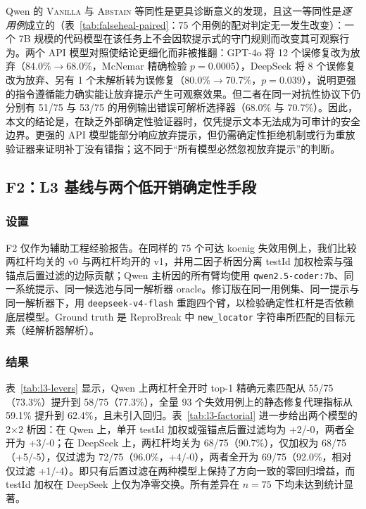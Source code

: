Qwen 的 \textsc{Vanilla} 与 \textsc{Abstain} 等同性是更具诊断意义的发现，且这一等同性是\emph{逐用例}成立的（表~\ref{tab:falseheal-paired}：75 个用例的配对判定无一发生改变）：一个 7B 规模的代码模型在该任务上不会因软提示式的守门规则而改变其可观察行为。两个 API 模型对照使结论更细化而非被推翻：GPT-4o 将 12 个误修复改为放弃（84.0\%$\to$68.0\%，McNemar 精确检验 $p=0.0005$），DeepSeek 将 8 个误修复改为放弃、另有 1 个未解析转为误修复（80.0\%$\to$70.7\%，$p=0.039$），说明更强的指令遵循能力确实能让放弃提示产生可观察效果。但二者在同一对抗性协议下仍分别有 51/75 与 53/75 的用例输出错误可解析选择器（68.0\% 与 70.7\%）。因此，本文的结论是，在缺乏外部确定性验证器时，仅凭提示文本无法成为可审计的安全边界。更强的 API 模型能部分响应放弃提示，但仍需确定性拒绝机制或行为重放验证器来证明补丁没有错指；这不同于“所有模型必然忽视放弃提示”的判断。

\subsection{F2：L3 基线与两个低开销确定性手段}
\label{sec:f2}

\subsubsection{设置}
F2 仅作为辅助工程经验报告。在同样的 75 个可达 koenig 失效用例上，我们比较两杠杆均关的 v0 与两杠杆均开的 v1，并用二因子析因分离 testId 加权检索与强锚点后置过滤的边际贡献；Qwen 主析因的所有臂均使用 \texttt{qwen2.5-coder:7b}、同一系统提示、同一候选池与同一解析器 oracle。修订版在同一用例集、同一提示与同一解析器下，用 \texttt{deepseek-v4-flash} 重跑四个臂，以检验确定性杠杆是否依赖底层模型。Ground truth 是 ReproBreak 中 \texttt{new\_locator} 字符串所匹配的目标元素（经解析器解析）。

\subsubsection{结果}
表~\ref{tab:l3-levers} 显示，Qwen 上两杠杆全开时 top-1 精确元素匹配从 55/75（73.3\%）提升到 58/75（77.3\%），全量 93 个失效用例上的静态修复代理指标从 59.1\% 提升到 62.4\%，且未引入回归。表~\ref{tab:l3-factorial} 进一步给出两个模型的 2$\times$2 析因：在 Qwen 上，单开 testId 加权或强锚点后置过滤均为 +2/-0，两者全开为 +3/-0；在 DeepSeek 上，两杠杆均关为 68/75（90.7\%），仅加权为 68/75（+5/-5），仅过滤为 72/75（96.0\%，+4/-0），两者全开为 69/75（92.0\%，相对仅过滤 +1/-4）。即只有后置过滤在两种模型上保持了方向一致的零回归增益，而 testId 加权在 DeepSeek 上仅为净零交换。所有差异在 $n=75$ 下均未达到统计显著。

